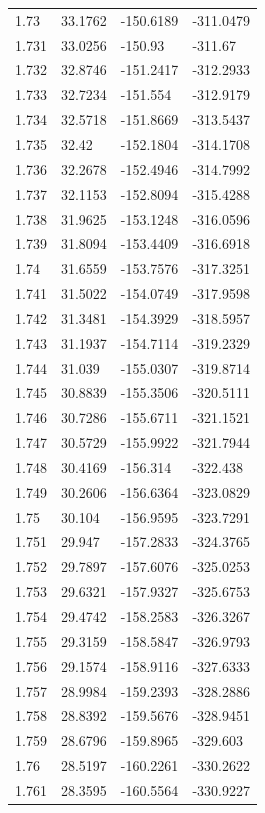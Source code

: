 \begin{tabular}{llll}
1.73 & 33.1762 & -150.6189 & -311.0479 \\
1.731 & 33.0256 & -150.93 & -311.67 \\
1.732 & 32.8746 & -151.2417 & -312.2933 \\
1.733 & 32.7234 & -151.554 & -312.9179 \\
1.734 & 32.5718 & -151.8669 & -313.5437 \\
1.735 & 32.42 & -152.1804 & -314.1708 \\
1.736 & 32.2678 & -152.4946 & -314.7992 \\
1.737 & 32.1153 & -152.8094 & -315.4288 \\
1.738 & 31.9625 & -153.1248 & -316.0596 \\
1.739 & 31.8094 & -153.4409 & -316.6918 \\
1.74 & 31.6559 & -153.7576 & -317.3251 \\
1.741 & 31.5022 & -154.0749 & -317.9598 \\
1.742 & 31.3481 & -154.3929 & -318.5957 \\
1.743 & 31.1937 & -154.7114 & -319.2329 \\
1.744 & 31.039 & -155.0307 & -319.8714 \\
1.745 & 30.8839 & -155.3506 & -320.5111 \\
1.746 & 30.7286 & -155.6711 & -321.1521 \\
1.747 & 30.5729 & -155.9922 & -321.7944 \\
1.748 & 30.4169 & -156.314 & -322.438 \\
1.749 & 30.2606 & -156.6364 & -323.0829 \\
1.75 & 30.104 & -156.9595 & -323.7291 \\
1.751 & 29.947 & -157.2833 & -324.3765 \\
1.752 & 29.7897 & -157.6076 & -325.0253 \\
1.753 & 29.6321 & -157.9327 & -325.6753 \\
1.754 & 29.4742 & -158.2583 & -326.3267 \\
1.755 & 29.3159 & -158.5847 & -326.9793 \\
1.756 & 29.1574 & -158.9116 & -327.6333 \\
1.757 & 28.9984 & -159.2393 & -328.2886 \\
1.758 & 28.8392 & -159.5676 & -328.9451 \\
1.759 & 28.6796 & -159.8965 & -329.603 \\
1.76 & 28.5197 & -160.2261 & -330.2622 \\
1.761 & 28.3595 & -160.5564 & -330.9227 \\

\end{tabular}
